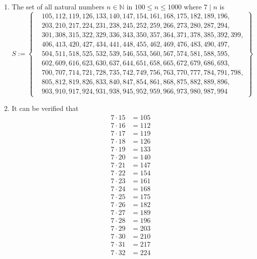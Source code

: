 \documentclass[12pt]{article}
\theoremstyle{definition}
\numberwithin{equation}{qn}
\newcommand{\nat}{\mathbb{N}}
\begin{document}
\begin{enumerate}
    \item The set of all natural numbers $n\in\nat$ in $100\leq n\leq 1000$ where $7\mid n$ is
        $$S := \left\{
        \begin{aligned}
            &105,112,119,126,133,140,147,154,161,168,175,182,189,196,\\
            &203,210,217,224,231,238,245,252,259,266,273,280,287,294,\\
            &301,308,315,322,329,336,343,350,357,364,371,378,385,392,399,\\
            &406,413,420,427,434,441,448,455,462,469,476,483,490,497,\\
            &504,511,518,525,532,539,546,553,560,567,574,581,588,595,\\
            &602,609,616,623,630,637,644,651,658,665,672,679,686,693,\\
            &700,707,714,721,728,735,742,749,756,763,770,777,784,791,798,\\
            &805,812,819,826,833,840,847,854,861,868,875,882,889,896,\\
            &903,910,917,924,931,938,945,952,959,966,973,980,987,994
        \end{aligned}
        \right\}
        $$
    \item It can be verified that
        $$
        \begin{matrix}
            7 \cdot 15 &= 105 \\ 7 \cdot 16 &= 112 \\ 7 \cdot 17 &= 119 \\
            7 \cdot 18 &= 126 \\ 7 \cdot 19 &= 133 \\ 7 \cdot 20 &= 140 \\
            7 \cdot 21 &= 147 \\ 7 \cdot 22 &= 154 \\ 7 \cdot 23 &= 161 \\
            7 \cdot 24 &= 168 \\ 7 \cdot 25 &= 175 \\ 7 \cdot 26 &= 182 \\
            7 \cdot 27 &= 189 \\ 7 \cdot 28 &= 196 \\ 7 \cdot 29 &= 203 \\
            7 \cdot 30 &= 210 \\ 7 \cdot 31 &= 217 \\ 7 \cdot 32 &= 224 \\

\end{matrix}$$
\end{enumerate}
\end{document}
